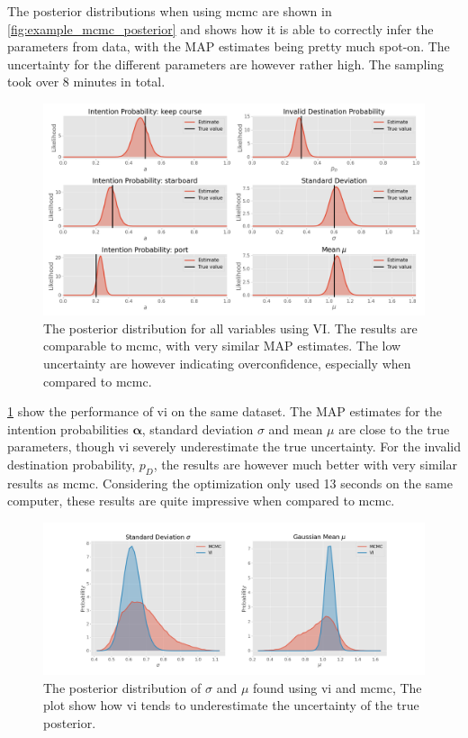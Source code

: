 The posterior distributions when using \acrshort{mcmc} are shown in \cref{fig:example_mcmc_posterior} and shows how it is able to correctly infer the parameters from data, with the MAP estimates being pretty much spot-on. The uncertainty for the different parameters are however rather high. The sampling took over 8 minutes in total. 

\begin{figure}[h]
    \centering
    \includegraphics[width=\textwidth]{figures/example_vi.png}
    \caption{The posterior distribution for all variables using VI. The results are comparable to \acrshort{mcmc}, with very similar MAP estimates. The low uncertainty are however indicating overconfidence, especially when compared to \acrshort{mcmc}.}
    \label{fig:example_vi_posterior}
\end{figure}


\cref{fig:example_vi_posterior} show the performance of  \acrshort{vi} on the same dataset. The MAP estimates for the intention probabilities $\boldsymbol{\alpha}$, standard deviation $\sigma$ and mean $\mu$ are close to the true parameters, though \acrshort{vi} severely underestimate the true uncertainty. For the invalid destination probability, $p_D$, the results are however much better with very similar results as \acrshort{mcmc}. Considering the optimization only used 13 seconds on the same computer, these results are quite impressive when compared to \acrshort{mcmc}.

\begin{figure}[h]
    \centering
    \includegraphics[width=\textwidth]{figures/example_vi_mcmc_comparison.png}
    \caption{The posterior distribution of $\sigma$ and $\mu$ found using \acrshort{vi} and \acrshort{mcmc}, The plot show how \acrshort{vi} tends to underestimate the uncertainty of the true posterior.}
    \label{fig:example_mcmc_vi_alphas}
\end{figure}

